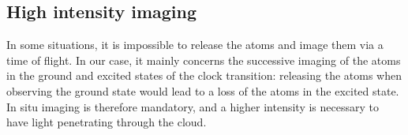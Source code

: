 \documentclass[11pt]{article}
\newcommand{\mathsc}[1]{\mathrm{\scriptscriptstyle {#1}}}
\numberwithin{equation}{section}
\numberwithin{figure}{section}
\begin{document}

\subsection{High intensity imaging}
\label{sec:high_intensity_imaging}

In some situations, it is impossible to release the atoms and image them via a time of flight. In our case, it mainly concerns the successive imaging of the atoms in the ground and excited states of the clock transition: releasing the atoms when observing the ground state would lead to a loss of the atoms in the excited state. In situ imaging is therefore mandatory, and a higher intensity is necessary to have light penetrating through the cloud.
\end{document}
